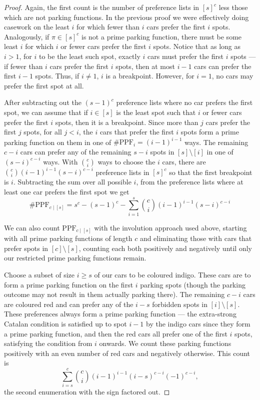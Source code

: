 \documentclass[12 pt]{amsart}
\theoremstyle{definition} %
\theoremstyle{remark} %
\begin{document}
\begin{proof}
	Again, the first count is the number of preference lists in $[s]^{c}$ less those which are not parking functions. In the previous proof we were effectively doing casework on the least $i$ for which fewer than $i$ cars prefer the first $i$ spots. Analogously, if $\pi \in [s]^{c}$ is not a prime parking function, there must be some least $i$ for which $i$ or fewer cars prefer the first $i$ spots. Notice that as long as $i > 1$, for $i$ to be the least such spot, exactly $i$ cars must prefer the first $i$ spots --- if fewer than $i$ cars prefer the first $i$ spots, then at most $i - 1$ cars can prefer the first $i - 1$ spots. Thus, if $i \neq 1$, $i$ is a breakpoint. However, for $i = 1$, no cars may prefer the first spot at all.

	After subtracting out the $(s - 1)^{c}$ preference lists where no car prefers the first spot, we can assume that if $i \in [s]$ is the least spot such that $i$ or fewer cars prefer the first $i$ spots, then it is a breakpoint. Since more than $j$ cars prefer the first $j$ spots, for all $j < i$, the $i$ cars that prefer the first $i$ spots form a prime parking function on them in one of $\# \mathrm{PPF}_{i} = (i - 1)^{i - 1}$ ways. The remaining $c - i$ cars can prefer any of the remaining $s - i$ spots in $[s] \setminus [i]$ in one of $(s - i)^{c - i}$ ways. With $\binom{c}{i}$ ways to choose the $i$ cars, there are $\binom{c}{i} (i - 1)^{i - 1} (s - i)^{c - i}$ preference lists in $[s]^{c}$ so that the first breakpoint is $i$. Subtracting the sum over all possible $i$, from the preference lists where at least one car prefers the first spot we get
	\[
		\# \mathrm{PPF}_{c \mid [s]} = s^{c} - (s - 1)^{c} - \sum_{i = 1}^{s} \binom{c}{i} (i - 1)^{i - 1} (s - i)^{c - i}
	\]

    We can also count $\mathrm{PPF}_{c \mid [s]}$ with the involution approach used above, starting with all prime parking functions of length $c$ and eliminating those with cars that prefer spots in $[c] \setminus [s]$, counting each both positively and negatively until only our restricted prime parking functions remain.

	Choose a subset of size $i \ge s$ of our cars to be coloured indigo. These cars are to form a prime parking function on the first $i$ parking spots (though the parking outcome may not result in them actually parking there). The remaining $c - i$ cars are coloured red and can prefer any of the $i - s$ forbidden spots in  $[i] \setminus [s]$. These preferences always form a prime parking function --- the extra-strong Catalan condition is satisfied up to spot $i-1$ by the indigo cars since they form a prime parking function, and then the red cars all prefer one of the first $i$ spots, satisfying the condition from $i$ onwards. We count these parking functions positively with an even number of red cars and negatively otherwise. This count is
	\[
		\sum_{i = s}^{c} \binom{c}{i} (i - 1)^{i - 1} (i - s)^{c - i} (-1)^{c - i},
	\]
	the second enumeration with the sign factored out.


\end{proof}
\end{document}
